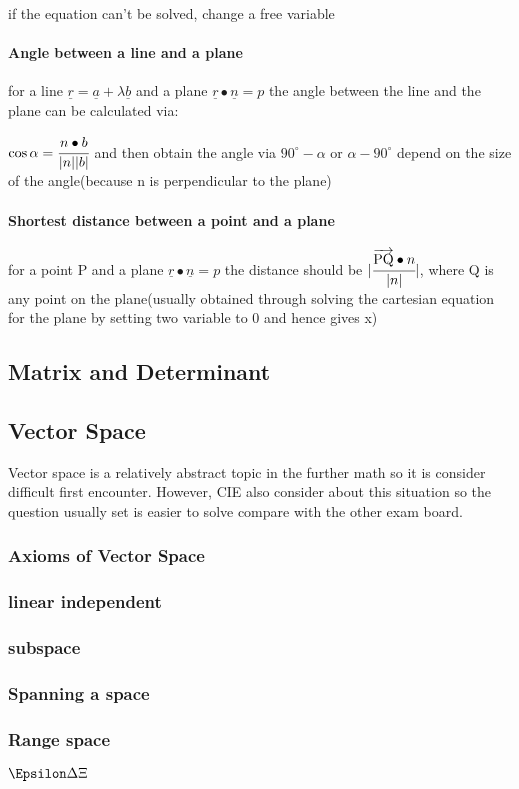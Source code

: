 \documentclass[]{article}
\let\oldparagraph\paragraph
\renewcommand{\paragraph}[1]{\oldparagraph{#1}\mbox{}}
\begin{document}
if the equation can't be solved, change a free variable

\paragraph{Angle between a line and a plane}\label{header-n291}

for a line \(\underline{r} = \underline{a} + \lambda\underline{b}\) and
a plane \(\underline{r}\bullet\underline{n} = p\) the angle between the
line and the plane can be calculated via:

\(\cos{\alpha} = \cfrac{n\bullet b}{|n||b|}\) and then obtain the angle
via \(90^{\circ} - \alpha\) or \(\alpha - 90^{\circ} \) depend on the
size of the angle(because n is perpendicular to the plane)

\paragraph{Shortest distance between a point and a
plane}\label{header-n294}

for a point P and a plane \(\underline{r}\bullet\underline{n} = p\) the
distance should be \(|\cfrac{\overrightarrow{\rm PQ}\bullet n}{|n|}|\),
where Q is any point on the plane(usually obtained through solving the
cartesian equation for the plane by setting two variable to 0 and hence
gives x)

\subsection{Matrix and Determinant}\label{header-n296}

\subsection{Vector Space}\label{header-n298}

Vector space is a relatively abstract topic in the further math so it is
consider difficult first encounter. However, CIE also consider about
this situation so the question usually set is easier to solve compare
with the other exam board.

\subsubsection{Axioms of Vector Space}\label{header-n300}

\subsubsection{linear independent}\label{header-n301}

\subsubsection{subspace}\label{header-n302}

\subsubsection{Spanning a space}\label{header-n303}

\subsubsection{Range space}\label{header-n304}

\(\Epsilon \Delta\Xi\)
\end{document}
